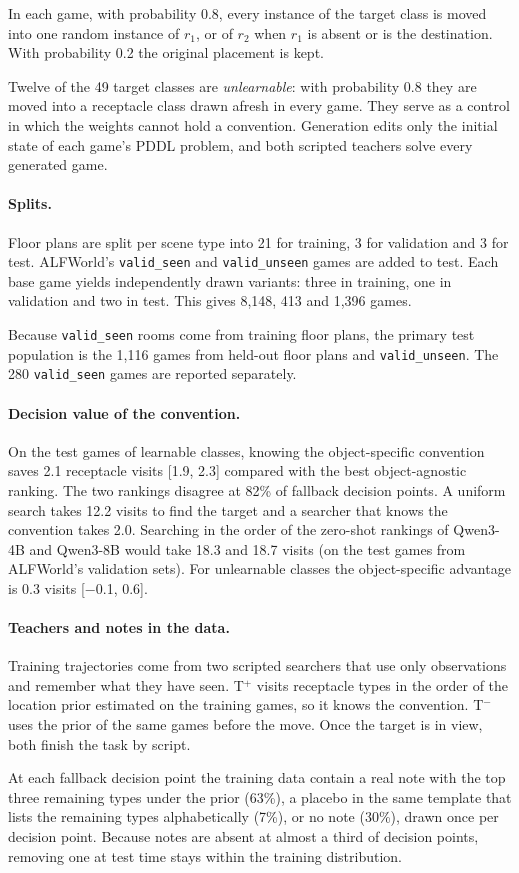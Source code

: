 In each game, with probability 0.8, every instance of the target class is moved into one random instance of $r_1$, or of $r_2$ when $r_1$ is absent or is the destination. With probability 0.2 the original placement is kept.

Twelve of the 49 target classes are \emph{unlearnable}: with probability 0.8 they are moved into a receptacle class drawn afresh in every game. They serve as a control in which the weights cannot hold a convention. Generation edits only the initial state of each game's PDDL problem, and both scripted teachers solve every generated game.

\paragraph{Splits.}
Floor plans are split per scene type into 21 for training, 3 for validation and 3 for test. ALFWorld's \texttt{valid\_seen} and \texttt{valid\_unseen} games are added to test. Each base game yields independently drawn variants: three in training, one in validation and two in test. This gives 8,148, 413 and 1,396 games.

Because \texttt{valid\_seen} rooms come from training floor plans, the primary test population is the 1,116 games from held-out floor plans and \texttt{valid\_unseen}. The 280 \texttt{valid\_seen} games are reported separately.

\paragraph{Decision value of the convention.}
On the test games of learnable classes, knowing the object-specific convention saves 2.1 receptacle visits [1.9, 2.3] compared with the best object-agnostic ranking. The two rankings disagree at 82\% of fallback decision points. A uniform search takes 12.2 visits to find the target and a searcher that knows the convention takes 2.0. Searching in the order of the zero-shot rankings of Qwen3-4B and Qwen3-8B would take 18.3 and 18.7 visits (on the test games from ALFWorld's validation sets). For unlearnable classes the object-specific advantage is 0.3 visits [$-$0.1, 0.6].

\paragraph{Teachers and notes in the data.}
Training trajectories come from two scripted searchers that use only observations and remember what they have seen. T$^+$ visits receptacle types in the order of the location prior estimated on the \alfcf{} training games, so it knows the convention. T$^-$ uses the prior of the same games before the move. Once the target is in view, both finish the task by script.

At each fallback decision point the training data contain a real note with the top three remaining types under the \alfcf{} prior (63\%), a placebo in the same template that lists the remaining types alphabetically (7\%), or no note (30\%), drawn once per decision point. Because notes are absent at almost a third of decision points, removing one at test time stays within the training distribution.
